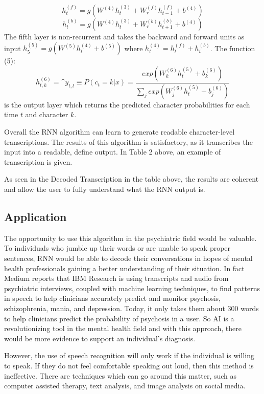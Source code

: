 \documentclass[11pt,technote,twocolumn]{IEEEtran}
\begin{document}
\begin{equation}\tag{4}
    h_t^{(f)} = g(W^{(4)}h_t^{(3)} + W_r^{(f)}h_{t-1}^{(f)} + b^{(4)})
\end{equation}
\begin{equation*}
     h_t^{(b)} = g(W^{(4)}h_t^{(3)} + W_r^{(b)}h_{t+1}^{(b)} + b^{(4)})
\end{equation*}
The fifth layer is non-recurrent and takes the backward and forward units as input $h_5^{(5)} = g(W^{(5)}h_t^{(4)} + b^{(5)})$ where $h_t^{(4)} = h_t^{(f)} + h_t^{(b)}$. The function (5):
\begin{equation}\tag{5}
    h_{t,k}^{(6)} = \^{y}_{t,l} \equiv P(c_t = k|x) = \frac{exp(W_k^{(6)}h_t^{(5)}+b_k^{(6)})}{\sum_j exp(W_j^{(6)}h_t^{(5)}+b_j^{(6)})}
\end{equation}
is the output layer which returns the predicted character probabilities for each time $t$ and character $k$. \cite{DBLP:journals/corr/HannunCCCDEPSSCN14}

\par
Overall the RNN algorithm can learn to generate readable character-level transcriptions. The results of this algorithm is satisfactory, as it transcribes the input into a readable, define output. In Table 2 above, an example of transcription is given.

As seen in the Decoded Transcription in the table above, the results are coherent and allow the user to fully understand what the RNN output is.
\subsection{Application}
The opportunity to use this algorithm in the psychiatric field would be valuable. To individuals who jumble up their words or are unable to speak proper sentences, RNN would be able to decode their conversations in hopes of mental health professionals gaining a better understanding of their situation. In fact Medium reports that IBM Research is using transcripts and audio from psychiatric interviews, coupled with machine learning techniques, to find patterns in speech to help clinicians accurately predict and monitor psychosis, schizophrenia, mania, and depression. Today, it only takes them about 300 words to help clinicians predict the probability of psychosis in a user. So AI is a revolutionizing tool in the mental health field and with this approach, there would be more evidence to support an individual's diagnosis.
\par
However, the use of speech recognition will only work if the individual is willing to speak. If they do not feel comfortable speaking out loud, then this method is ineffective. There are techniques which can go around this matter, such as computer assisted therapy, text analysis, and image analysis on social media.
\end{document}
